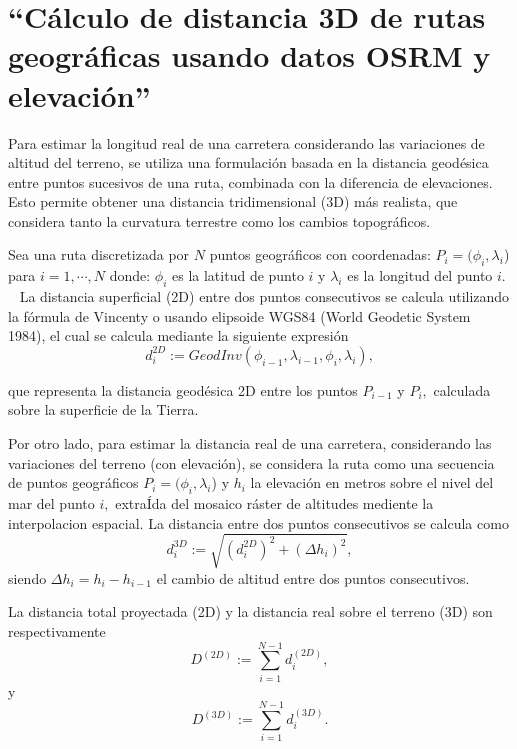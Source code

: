 \documentclass[
  letterpaper,
  DIV=11,
  numbers=noendperiod]{scrreprt}
\begin{document}
\section{``Cálculo de distancia 3D de rutas geográficas usando datos
OSRM y
elevación''}\label{cuxe1lculo-de-distancia-3d-de-rutas-geogruxe1ficas-usando-datos-osrm-y-elevaciuxf3n}

Para estimar la longitud real de una carretera considerando las
variaciones de altitud del terreno, se utiliza una formulación basada en
la distancia geodésica entre puntos sucesivos de una ruta, combinada con
la diferencia de elevaciones. Esto permite obtener una distancia
tridimensional (3D) más realista, que considera tanto la curvatura
terrestre como los cambios topográficos.

Sea una ruta discretizada por \(N\) puntos geográficos con coordenadas:
\(P_i= (\phi_i, \lambda_i\)) para \(i=1, \cdots, N\) donde: \(\phi_i\)
es la latitud de punto \(i\) y \(\lambda_i\) es la longitud del punto
\(i\). ~ La distancia superficial (2D) entre dos puntos consecutivos se
calcula utilizando la fórmula de Vincenty o usando elipsoide WGS84
(World Geodetic System 1984), el cual se calcula mediante la siguiente
expresión ~\[
 d_i^{2D}:= GeodInv(\phi_{i-1}, \lambda_{i-1}, \phi_i, \lambda_i),
 \]

que representa la distancia geodésica 2D entre los puntos \(P_{i-1}\) y
\(P_{i},\) calculada sobre la superficie de la Tierra.

Por otro lado, para estimar la distancia real de una carretera,
considerando las variaciones del terreno (con elevación), se considera
la ruta como una secuencia de puntos geográficos
\(P_i= (\phi_i, \lambda_i\)) y \(h_i\) la elevación en metros sobre el
nivel del mar del punto \(i,\) extraÍda del mosaico ráster de altitudes
mediente la interpolacion espacial. La distancia entre dos puntos
consecutivos se calcula como \[
d_i^{3D} := \sqrt{(d_i^{2D})^2+(\Delta h_i)^2},
\] siendo \(\Delta h_i= h_i-h_{i-1}\) el cambio de altitud entre dos
puntos consecutivos.

La distancia total proyectada (2D) y la distancia real sobre el terreno
(3D) son respectivamente \[
D^{(2D)}:= \sum_{i=1}^{N-1} d_i^{(2D)},
\] y \[
D^{(3D)}:= \sum_{i=1}^{N-1} d_i^{(3D)}.
\]
\end{document}
